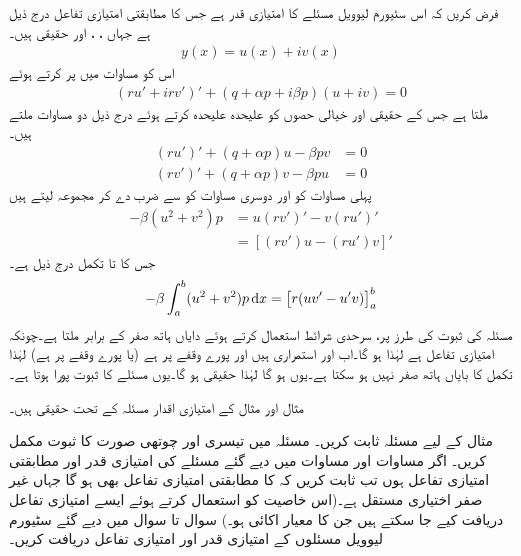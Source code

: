 فرض کریں کہ اس سٹیورم لیوویل مسئلے کا   امتیازی قدر ہے جس کا مطابقتی امتیازی تفاعل درج ذیل ہے جہاں ، ،  اور  حقیقی ہیں۔
\begin{align}
y(x)=u(x)+iv(x)
\end{align} 
اس کو مساوات  میں پر کرتے ہوئے
\begin{align*}
(ru'+irv')'+(q+\alpha p+i\beta p)(u+iv)=0
\end{align*}
ملتا ہے جس کے حقیقی اور  خیالی حصوں کو علیحدہ علیحدہ کرتے ہوئے درج ذیل دو مساوات ملتے ہیں۔
\begin{align*}
(ru')'+(q+\alpha p)u-\beta p v&=0\\
(rv')'+(q+\alpha p)v-\beta p u&=0
\end{align*}
پہلی مساوات کو  اور دوسری مساوات کو  سے ضرب دے کر مجموعہ لیتے ہیں
\begin{align*}
-\beta(u^2+v^2)p&=u(rv')'-v(ru')'\\
&=[(rv')u-(ru')v]'
\end{align*}
جس کا  تا  تکمل درج ذیل ہے۔
\begin{align*}
-\beta \int_a^b (u^2+v^2)p\dif x=\left[r(uv'-u'v)\right]_a^b
\end{align*}
مسئلہ  کی ثبوت کی طرز پر، سرحدی شرائط استعمال کرتے ہوئے دایاں ہاتھ صفر کے برابر ملتا ہے۔چونکہ  امتیازی تفاعل ہے لہٰذا  ہو گا۔اب  اور  استمراری ہیں اور پورے وقفے پر   ہے (یا پورے وقفے پر   ہے) لہٰذا تکمل کا بایاں ہاتھ صفر نہیں ہو سکتا ہے۔یوں  ہو گا لہٰذا   حقیقی ہو گا۔یوں مسئلے کا ثبوت پورا ہوتا ہے۔

مثال  اور مثال  کے امتیازی اقدار مسئلہ  کے تحت حقیقی ہیں۔


مثال  کے لیے مسئلہ   ثابت کریں۔
مسئلہ   میں تیسری اور چوتھی صورت  کا ثبوت مکمل کریں۔
اگر مساوات  اور مساوات  میں دیے گئے مسئلے کی امتیازی قدر  اور مطابقتی امتیازی تفاعل  ہوں تب ثابت کریں کہ  کا مطابقتی امتیازی تفاعل  بھی ہو گا جہاں  غیر صفر اختیاری مستقل ہے۔(اس خاصیت کو استعمال کرتے ہوئے ایسے امتیازی تفاعل دریافت کیے جا سکتے ہیں جن کا معیار اکائی ہو۔)
سوال  تا سوال  میں دیے گئے سٹیورم لیوویل مسئلوں کے امتیازی قدر اور امتیازی تفاعل دریافت کریں۔

